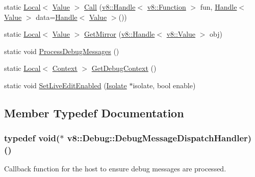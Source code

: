 \begin{DoxyCompactItemize}
\item 
static \hyperlink{classv8_1_1Local}{Local}$<$ \hyperlink{classv8_1_1Value}{Value} $>$ \hyperlink{classv8_1_1Debug_a49a3e0cf585cfd201d8ab1bc395d0593}{Call} (\hyperlink{classv8_1_1Handle}{v8\+::\+Handle}$<$ \hyperlink{classv8_1_1Function}{v8\+::\+Function} $>$ fun, \hyperlink{classv8_1_1Handle}{Handle}$<$ \hyperlink{classv8_1_1Value}{Value} $>$ data=\hyperlink{classv8_1_1Handle}{Handle}$<$ \hyperlink{classv8_1_1Value}{Value} $>$())
\item 
static \hyperlink{classv8_1_1Local}{Local}$<$ \hyperlink{classv8_1_1Value}{Value} $>$ \hyperlink{classv8_1_1Debug_aa7d07c7d5c9ee2eaaa9af310bcbf58f5}{Get\+Mirror} (\hyperlink{classv8_1_1Handle}{v8\+::\+Handle}$<$ \hyperlink{classv8_1_1Value}{v8\+::\+Value} $>$ obj)
\item 
static void \hyperlink{classv8_1_1Debug_a888e06766caee0380c6aa010b00e1a54}{Process\+Debug\+Messages} ()
\item 
static \hyperlink{classv8_1_1Local}{Local}$<$ \hyperlink{classv8_1_1Context}{Context} $>$ \hyperlink{classv8_1_1Debug_a2343a321b0db41324b7e8a7402f57cf0}{Get\+Debug\+Context} ()
\item 
static void \hyperlink{classv8_1_1Debug_ab635f979d369bed13187e2594d825517}{Set\+Live\+Edit\+Enabled} (\hyperlink{classv8_1_1Isolate}{Isolate} $\ast$isolate, bool enable)
\end{DoxyCompactItemize}


\subsection{Member Typedef Documentation}
\hypertarget{classv8_1_1Debug_a91cd8aa9743e3478bc63fe73abcd557c}{}
\subsubsection[{Debug\+Message\+Dispatch\+Handler}]{\setlength{\rightskip}{0pt plus 5cm}typedef void($\ast$ v8\+::\+Debug\+::\+Debug\+Message\+Dispatch\+Handler) ()}\label{classv8_1_1Debug_a91cd8aa9743e3478bc63fe73abcd557c}
Callback function for the host to ensure debug messages are processed. \hypertarget{classv8_1_1Debug_ab53894746a21222796062f0e81ea28d8}{}

